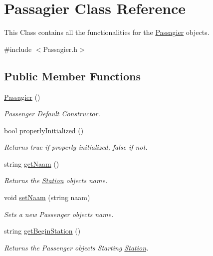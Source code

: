 \hypertarget{classPassagier}{}\section{Passagier Class Reference}
\label{classPassagier}


This Class contains all the functionalities for the \hyperlink{classPassagier}{Passagier} objects.  




{\ttfamily \#include $<$Passagier.\+h$>$}

\subsection*{Public Member Functions}
\begin{DoxyCompactItemize}
\item 
\hyperlink{classPassagier_a1a2bc82f5780448cd2a9a47d08cc824f}{Passagier} ()
\begin{DoxyCompactList}\small\item\em Passenger Default Constructor. \end{DoxyCompactList}\item 
bool \hyperlink{classPassagier_ae271ce7875b2a7d17704e204ce9d8568}{properly\+Initialized} ()
\begin{DoxyCompactList}\small\item\em Returns true if properly initialized, false if not. \end{DoxyCompactList}\item 
string \hyperlink{classPassagier_aa9a9b53d417979551b0cb30fb0fdd232}{get\+Naam} ()
\begin{DoxyCompactList}\small\item\em Returns the \hyperlink{classStation}{Station} object\textquotesingle{}s name. \end{DoxyCompactList}\item 
void \hyperlink{classPassagier_a8d7a04358b35de18f378d048610e9aff}{set\+Naam} (string naam)
\begin{DoxyCompactList}\small\item\em Sets a new Passenger object\textquotesingle{}s name. \end{DoxyCompactList}\item 
string \hyperlink{classPassagier_a41e0870bb942364181aa17e2c9c7ca6c}{get\+Begin\+Station} ()
\begin{DoxyCompactList}\small\item\em Returns the Passenger object\textquotesingle{}s Starting \hyperlink{classStation}{Station}. \end{DoxyCompactList}\item 

\end{DoxyCompactItemize}
